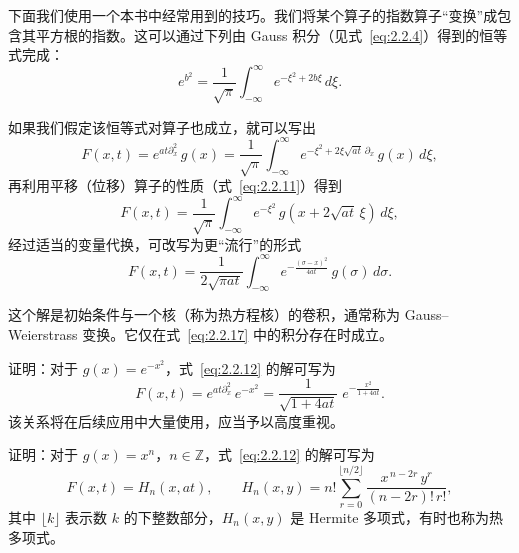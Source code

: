 下面我们使用一个本书中经常用到的技巧。我们将某个算子的指数算子``变换''成包含其平方根的指数。这可以通过下列由 Gauss 积分（见式~\eqref{eq:2.2.4}）得到的恒等式完成：
\begin{equation}
e^{b^{2}}=\frac{1}{\sqrt{\pi}}\int_{-\infty}^{\infty}e^{-\xi^{2}+2b\xi}\,d\xi.
\label{eq:2.2.14}
\end{equation}

如果我们假定该恒等式对算子也成立，就可以写出
\begin{equation}
F(x,t)=e^{a t\partial_{x}^{2}}\,g(x)
=\frac{1}{\sqrt{\pi}}\int_{-\infty}^{\infty}
e^{-\xi^{2}+2\xi\sqrt{a t}\,\partial_{x}}\,g(x)\,d\xi,
\label{eq:2.2.15}
\end{equation}
再利用平移（位移）算子的性质（式~\eqref{eq:2.2.11}）得到
\begin{equation}
F(x,t)=\frac{1}{\sqrt{\pi}}\int_{-\infty}^{\infty}
e^{-\xi^{2}}\,g(x+2\sqrt{a t}\,\xi)\,d\xi,
\label{eq:2.2.16}
\end{equation}
经过适当的变量代换，可改写为更``流行''的形式
\begin{equation}
F(x,t)=\frac{1}{2\sqrt{\pi a t}}
\int_{-\infty}^{\infty}e^{-\frac{(\sigma-x)^{2}}{4 a t}}\,g(\sigma)\,d\sigma.
\label{eq:2.2.17}
\end{equation}

这个解是初始条件与一个核（称为热方程核）的卷积，通常称为 Gauss--Weierstrass 变换。它仅在式~\eqref{eq:2.2.17} 中的积分存在时成立。

\begin{exercise}
证明：对于 $g(x)=e^{-x^{2}}$，式~\eqref{eq:2.2.12} 的解可写为
\begin{equation}
F(x,t)=e^{a t\partial_{x}^{2}}\,e^{-x^{2}}
=\frac{1}{\sqrt{1+4 a t}}\;e^{-\frac{x^{2}}{1+4 a t}}.
\label{eq:2.2.18}
\end{equation}
该关系将在后续应用中大量使用，应当予以高度重视。
\end{exercise}

\begin{exercise}
证明：对于 $g(x)=x^{n}$，$n\in\mathbb{Z}$，式~\eqref{eq:2.2.12} 的解可写为
\begin{equation}
F(x,t)=H_{n}(x,a t),\qquad
H_{n}(x,y)=n!\sum_{r=0}^{\lfloor n/2\rfloor}
\frac{x^{\,n-2r}\,y^{r}}{(n-2r)!\,r!},
\label{eq:2.2.19}
\end{equation}
其中 $\lfloor k\rfloor$ 表示数 $k$ 的下整数部分，$H_{n}(x,y)$ 是 Hermite 多项式，有时也称为热多项式。
\end{exercise}

